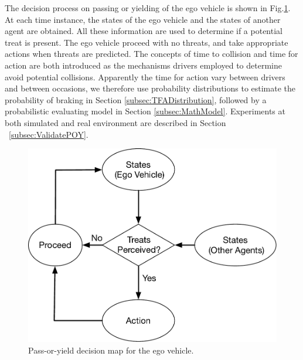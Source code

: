 The decision process on passing or yielding of the ego vehicle is shown in Fig.\ref{fig:decision_map}. At each time instance, the states of the ego vehicle and the states of another agent are obtained. All these information are used to determine if a potential treat is present. The ego vehicle proceed with no threats, and take appropriate actions when threats are predicted. The concepts of time to collision and time for action are both introduced as the mechanisms drivers employed to determine avoid potential collisions. Apparently the time for action vary between drivers and between occasions, we therefore use probability distributions to estimate the probability of braking in Section \ref{subsec:TFADistribution}, followed by a probabilistic evaluating model in Section \ref{subsec:MathModel}. Experiments at both simulated and real environment are described in Section ~\ref{subsec:ValidatePOY}.
\begin{figure}[htbp!]
\begin{center}
\includegraphics[scale=0.63]{Methodology/figs/Decision_Map.pdf}
\end{center}
\caption{Pass-or-yield decision map for the ego vehicle.}
\label{fig:decision_map} 
\end{figure}








